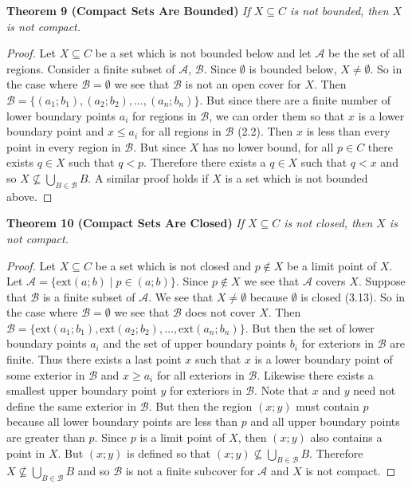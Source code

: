 \documentclass{article}
\begin{document}
\begin{flushleft}
\textbf{Theorem 9 (Compact Sets Are Bounded)}
\textsl{If $X \subseteq C$ is not bounded, then $X$ is not compact.}
\begin{proof}
Let $X \subseteq C$ be a set which is not bounded below and let $\mathcal{A}$ be the set of all regions. Consider a finite subset of $\mathcal{A}$, $\mathcal{B}$. Since $\emptyset$ is bounded below, $X \neq \emptyset$. So in the case where $\mathcal{B} = \emptyset$ we see that $\mathcal{B}$ is not an open cover for $X$. Then $\mathcal{B}=\{(a_1;b_1),(a_2;b_2), \dots ,(a_n;b_n)\}$. But since there are a finite number of lower boundary points $a_i$ for regions in $\mathcal{B}$, we can order them so that $x$ is a lower boundary point and $x \leq a_i$ for all regions in $\mathcal{B}$ (2.2). Then $x$ is less than every point in every region in $\mathcal{B}$. But since $X$ has no lower bound, for all $p \in C$ there exists $q \in X$ such that $q < p$. Therefore there exists a $q \in X$ such that $q < x$ and so $X \nsubseteq \bigcup_{B \in \mathcal{B}} B$. A similar proof holds if $X$ is a set which is not bounded above.
\end{proof}

\textbf{Theorem 10 (Compact Sets Are Closed)}
\textsl{If $X \subseteq C$ is not closed, then $X$ is not compact.}
\begin{proof}
Let $X \subseteq C$ be a set which is not closed and $p \notin X$ be a limit point of $X$. Let $\mathcal{A} = \{\text{ext}(a;b) \mid p \in (a;b)\}$. Since $p \notin X$ we see that $\mathcal{A}$ covers $X$. Suppose that $\mathcal{B}$ is a finite subset of $\mathcal{A}$. We see that $X \neq \emptyset$ because $\emptyset$ is closed (3.13). So in the case where $\mathcal{B}=\emptyset$ we see that $\mathcal{B}$ does not cover $X$. Then $\mathcal{B} = \{\text{ext}(a_1;b_1), \text{ext}(a_2;b_2), \dots ,\text{ext}(a_n;b_n)\}$. But then the set of lower boundary points $a_i$ and the set of upper boundary points $b_i$ for exteriors in $\mathcal{B}$ are finite. Thus there exists a last point $x$ such that $x$ is a lower boundary point of some exterior in $\mathcal{B}$ and $x \geq a_i$ for all exteriors in $\mathcal{B}$. Likewise there exists a smallest upper boundary point $y$ for exteriors in $\mathcal{B}$. Note that $x$ and $y$ need not define the same exterior in $\mathcal{B}$. But then the region $(x;y)$ must contain $p$ because all lower boundary points are less than $p$ and all upper boundary points are greater than $p$. Since $p$ is a limit point of $X$, then $(x;y)$ also contains a point in $X$. But $(x;y)$ is defined so that $(x;y) \nsubseteq \bigcup_{B \in \mathcal{B}} B$. Therefore $X \nsubseteq \bigcup_{B \in \mathcal{B}} B$ and so $\mathcal{B}$ is not a finite subcover for $\mathcal{A}$ and $X$ is not compact.
\end{proof}


\end{flushleft}
\end{document}

